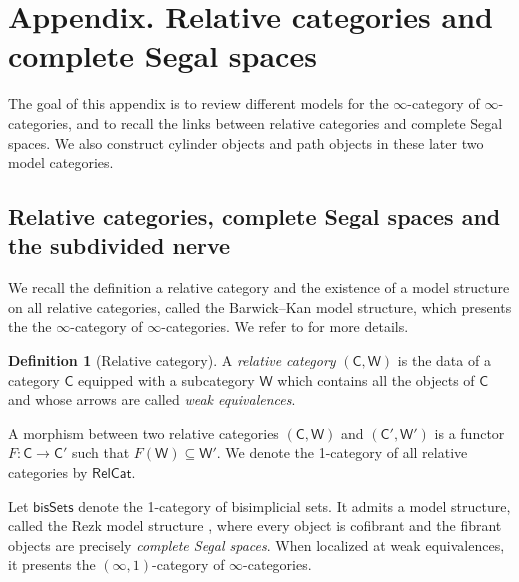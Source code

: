 \documentclass[a4paper,12pt]{amsart}
\theoremstyle{plain}
\theoremstyle{definition}
\newtheorem{definition}[theorem]{Definition}%
\theoremstyle{remark}
\begin{document}
\section{Appendix. Relative categories and complete Segal spaces}\label{Appendix A: Relative categories}

\vspace{2.5pc}

The goal of this appendix is to review different models for the $\infty$-category of $\infty$-categories, and to recall the links between relative categories and complete Segal spaces. We also construct cylinder objects and path objects in these later two model categories. 

\subsection{Relative categories, complete Segal spaces and the subdivided nerve} We recall the definition a relative category and the existence of a model structure on all relative categories, called the Barwick--Kan model structure, which presents the the $\infty$-category of $\infty$-categories. We refer to \cite{BarwickKan1} for more details. 

\begin{definition}[Relative category]
A \textit{relative category} $(\mathsf{C},\mathsf{W})$ is the data of a category $\mathsf{C}$ equip\-ped with a subcategory $\mathsf{W}$ which contains all the objects of $\mathsf{C}$ and whose arrows are called \textit{weak equivalences}. 
\end{definition}

A morphism between two relative categories $(\mathsf{C},\mathsf{W})$ and $(\mathsf{C}',\mathsf{W}')$ is a functor $F: \mathsf{C} \longrightarrow \mathsf{C}'$ such that $F(\mathsf{W}) \subseteq \mathsf{W}'$. We denote the 1-category of all relative categories by $\mathsf{RelCat}$. 


Let $\mathsf{bisSets}$ denote the 1-category of bisimplicial sets. It admits a model structure, called the Rezk model structure \cite{Rezk01}, where every object is cofibrant and the fibrant objects are precisely \textit{complete Segal spaces}. When localized at weak equivalences, it presents the $(\infty,1)$-category of $\infty$-categories. 
\end{document}
